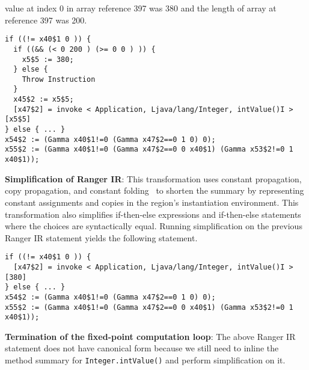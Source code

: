value at index 0 in array reference 397 was 380 and the length of array at reference 397 was 200.\\
\begin{lstlisting}[numbers=none]
if ((!= x40$1 0 )) {
  if ((&& (< 0 200 ) (>= 0 0 ) )) {
    x5$5 := 380;
  } else {
    Throw Instruction
  }
  x45$2 := x5$5;
  [x47$2] = invoke < Application, Ljava/lang/Integer, intValue()I >[x5$5]
} else { ... }
x54$2 := (Gamma x40$1!=0 (Gamma x47$2==0 1 0) 0);
x55$2 := (Gamma x40$1!=0 (Gamma x47$2==0 0 x40$1) (Gamma x53$2!=0 1 x40$1));
\end{lstlisting}
%
\textbf{Simplification of Ranger IR}: This transformation uses constant propagation, copy propagation, and constant
folding~\cite{dragon-book} to shorten the summary by representing constant assignments and copies
in the region\rq s instantiation environment.
%
This transformation also simplifies if-then-else expressions and if-then-else statements where the choices are
syntactically equal.
%
Running simplification on the previous Ranger IR statement yields the following statement.
\begin{lstlisting}[numbers=none]
if ((!= x40$1 0 )) {
  [x47$2] = invoke < Application, Ljava/lang/Integer, intValue()I >[380]
} else { ... }
x54$2 := (Gamma x40$1!=0 (Gamma x47$2==0 1 0) 0);
x55$2 := (Gamma x40$1!=0 (Gamma x47$2==0 0 x40$1) (Gamma x53$2!=0 1 x40$1));
\end{lstlisting}
%
\textbf{Termination of the fixed-point computation loop}: The above Ranger IR statement does not have canonical form
because we still need to inline the method summary for {\tt Integer.intValue()} and perform simplification on it.
